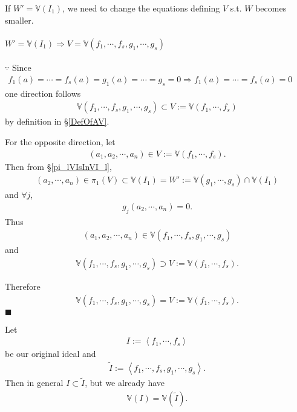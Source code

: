 \documentclass[11pt]{book}
\begin{document}
If $W' = \mathbb{V}(I_1)$, we need to change the equations defining $V$ s.t. $W$ becomes smaller.

\paragraph{$W' = \mathbb{V}(I_1) \Rightarrow V = \mathbb{V}(f_1, \cdots, f_s, g_1, \cdots, g_s)$}
$\because$ Since
\begin{eqnarray}
f_1(a) = \cdots= f_s(a) = g_1(a) = \cdots = g_s = 0 \Rightarrow f_1(a) = \cdots= f_s(a) = 0 \qquad
\end{eqnarray}
one direction follows
\begin{eqnarray}
\mathbb{V}(f_1, \cdots, f_s, g_1, \cdots, g_s) \subset V := \mathbb{V}(f_1, \cdots, f_s) 
\end{eqnarray}
by definition in \S\ref{DefOfAV}.

For the opposite direction, let
\begin{eqnarray}
(a_1,a_2, \cdots, a_n) \in V := \mathbb{V}(f_1, \cdots, f_s).
\end{eqnarray}
Then from \S\ref{pi_lVIsInVI_l},
\begin{eqnarray}
(a_2, \cdots, a_n) \in \pi_1(V) \subset \mathbb{V}(I_1) = W':= \mathbb{V}(g_1, \cdots, g_s) \cap \mathbb{V}(I_1)
\end{eqnarray}
and $\forall j$,
\begin{eqnarray}
g_j(a_2, \cdots, a_n) = 0.
\end{eqnarray}
Thus
\begin{eqnarray}
(a_1,a_2, \cdots, a_n) \in \mathbb{V}(f_1, \cdots, f_s, g_1, \cdots, g_s)
\end{eqnarray}
and
\begin{eqnarray}
\mathbb{V}(f_1, \cdots, f_s, g_1, \cdots, g_s) \supset V := \mathbb{V}(f_1, \cdots, f_s).
\end{eqnarray}

Therefore
\begin{eqnarray}
\mathbb{V}(f_1, \cdots, f_s, g_1, \cdots, g_s) = V := \mathbb{V}(f_1, \cdots, f_s).
\end{eqnarray}
$\blacksquare$

Let
\begin{eqnarray}
I := \left< f_1, \cdots, f_s \right>
\end{eqnarray}
be our original ideal and
\begin{eqnarray}
\tilde{I} := \left< f_1, \cdots, f_s, g_1, \cdots, g_s \right>.
\end{eqnarray}
Then in general $I \subset \tilde{I}$, but we already have
\begin{eqnarray}
\mathbb{V}(I) = \mathbb{V}(\tilde{I}).
\end{eqnarray}
\end{document}

